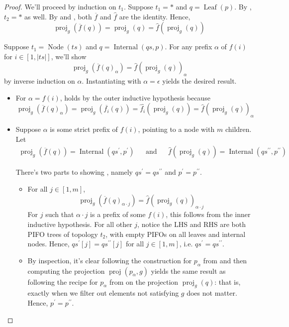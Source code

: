 \documentclass{amsart}
\DeclareMathOperator{\proj}{\mathrm{proj}}
\DeclareMathOperator{\Leaf}{\mathrm{Leaf}}
\DeclareMathOperator{\Internal}{\mathrm{Internal}}
\DeclareMathOperator{\Node}{\mathrm{Node}}
\theoremstyle{definition}
\begin{document}
\begin{proof}
    We'll proceed by induction on $t_1$.
    Suppose $t_1 = \ast$ and $q = \Leaf(p)$. 
    By \cite[Lemma ~5.3]{OG}, $t_2 = \ast$ as well.
    By  and \cite[Definition ~5.4]{OG}, both $\overline{f}$ and $\widehat{f}$ are the identity.
    Hence,
    $$\proj_g(\overline{f}(q)) = \proj_g(q) = \widehat{f}(\proj_g(q))$$

    Suppose $t_1 = \Node(ts)$ and $q = \Internal(qs, p)$.
    For any prefix $\alpha$ of $f(i)$ for $i \in [1, |ts|]$, we'll show
    \begin{equation}
        \label{eq:cd1}
        \proj_g(\overline{f}(q)_{\alpha}) = \widehat{f}(\proj_g(q))_{\alpha}
        \tag{$\ast$}
    \end{equation}
    by inverse induction on $\alpha$. 
    Instantiating  with $\alpha = \epsilon$ yields the desired result. 
    \begin{itemize}
        \item For $\alpha = f(i)$,  holds by the outer inductive hypothesis because
            $$\proj_g(\overline{f}(q)_{\alpha}) = \proj_g(\overline{f_i}(q)) = \widehat{f_i}(\proj_g(q)) = \widehat{f}(\proj_g(q))_{\alpha}$$

        \item Suppose $\alpha$ is some strict prefix of $f(i)$, pointing to a node with $m$ children. Let
            \begin{align*}
                \proj_g(\overline{f}(q)) = \Internal(qs^\prime, p^\prime) 
                &&\text{and}&&
                \widehat{f}(\proj_g(q)) = \Internal(qs^{\prime\prime}, p^{\prime\prime})
            \end{align*}

            There's two parts to showing , namely $qs^{\prime} = qs^{\prime\prime}$ and $p^\prime = p^{\prime\prime}$.

            \begin{itemize}
                \item For all $j \in [1,m]$,
                    $$\proj_g(\overline{f}(q)_{\alpha \cdot j}) = \widehat{f}(\proj_g(q))_{\alpha \cdot j}$$
                    For $j$ such that $\alpha \cdot j$ is a prefix of some $f(i)$, this follows from the inner inductive hypothesis.
                    For all other $j$, notice the LHS and RHS are both PIFO trees of topology $t_2$, with empty PIFOs on all leaves and internal nodes.
                    Hence, $qs^{\prime}[j] = qs^{\prime\prime}[j]$ for all $j \in [1,m]$, i.e. $qs^{\prime} = qs^{\prime\prime}$.
                \item By inspection, it's clear following the construction for $p_\alpha$ from  and then computing the projection $\proj(p_\alpha, g)$ 
                    yields the same result as following the recipe for $p_\alpha$ from \cite[Definition ~5.4]{OG} on the projection $\proj_g(q)$: 
                    that is, exactly when we filter out elements not satisfying $g$ does not matter.
                    Hence, $p^{\prime} = p^{\prime\prime}$.
            \end{itemize}
    \end{itemize}
\end{proof}
\end{document}
